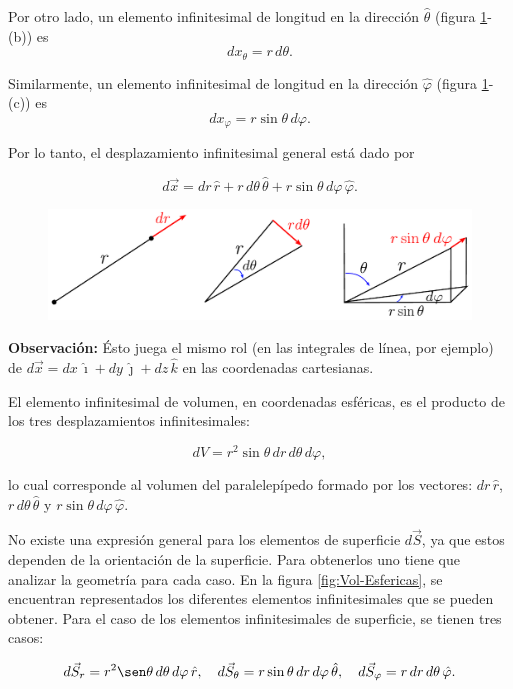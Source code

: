 Por otro lado, un elemento infinitesimal de longitud en la dirección $\hat{\theta}$ (figura \ref{fig:Elemento-Esferica}-(b)) es
$$dx_{\theta} = r \,d\theta.$$

Similarmente, un elemento infinitesimal de longitud en la dirección $\hat{\varphi}$ (figura \ref{fig:Elemento-Esferica}-(c)) es
$$dx_{\varphi} = r \sin\theta \,d\varphi.$$

Por lo tanto, el desplazamiento infinitesimal general está dado por
\begin{shaded}
    $$d\Vec{x} = dr \, \hat{r} + r \,d\theta \,\hat{\theta} + r \sin \theta \,d\varphi \,\hat{\varphi}.$$
\end{shaded}

\begin{figure}[H]
    \centering
    \includegraphics[scale = 0.7]{Figuras/Elemento-Esferica.pdf}
    \caption{}
    \label{fig:Elemento-Esferica}
\end{figure}

\textbf{Observación:} Ésto juega el mismo rol (en las integrales de línea, por ejemplo) de $d\Vec{x} = dx \,\hat{\imath} + dy\,\hat{\jmath} + dz \,\hat{k}$ en las coordenadas cartesianas.

El elemento infinitesimal de volumen, en coordenadas esféricas, es el producto de los tres desplazamientos infinitesimales:
\begin{shaded}
    $$dV = r^2 \sin \theta \,dr\,d\theta\,d\varphi,$$
\end{shaded}

lo cual corresponde al volumen del paralelepípedo formado por los vectores: $dr \,\hat{r}$, $r \,d\theta \, \hat{\theta}$ y $r \sin \theta \,d\varphi \, \hat{\varphi}$.

No existe una expresión general para los elementos de superficie $d\Vec{S}$, ya que estos dependen de la orientación de la superficie. Para obtenerlos uno tiene que analizar la geometría para cada caso. En la figura \ref{fig:Vol-Esfericas}, se encuentran representados los diferentes elementos infinitesimales que se pueden obtener. Para el caso de los elementos infinitesimales  de superficie, se tienen tres casos:
\begin{shaded}
  \begin{equation*}
d\vec{S}_r = r^2 \sen \theta\, d\theta\, d\varphi \,\hat{r} ,\quad d\vec{S}_{\theta} = r \sin\theta \,dr \,d \varphi \,\hat{\theta}, \quad  d\vec{S}_{\varphi} = r \,dr\, d\theta \,\hat{\varphi}.
\end{equation*}  
\end{shaded}

